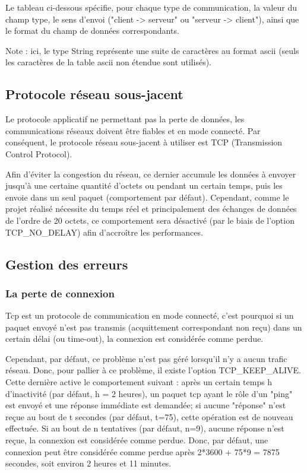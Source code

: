 \documentclass[11pt, a4paper]{report}
\begin{document}
      Le tableau ci-dessous spécifie, pour chaque type de communication, la valeur du champ type, le sens d'envoi ("client -> serveur" ou "serveur -> client"), ainsi 
      que le format du champ de données correspondants.

      
      
      Note : ici, le type String représente une suite de caractères au format ascii (seuls les caractères de la table ascii non étendue sont utilisés). 
    
    \subsection{Protocole réseau sous-jacent}
    
      Le protocole applicatif ne permettant pas la perte de données, les communications réseaux doivent être fiables et en mode connecté.
      Par conséquent, le protocole réseau sous-jacent à utiliser est TCP (Transmission Control Protocol).
      \newline
      
      Afin d'éviter la congestion du réseau, ce dernier accumule les données à envoyer jusqu'à une certaine quantité d'octets ou pendant un certain temps, 
      puis les envoie dans un seul paquet (comportement par défaut). Cependant, comme le projet réalisé nécessite du temps réel et principalement des 
      échanges de données de l'ordre de 20 octets, ce comportement sera désactivé (par le biais de l'option TCP\_NO\_DELAY) afin d’accroître les performances.
	  
    \subsection{Gestion des erreurs}
    
      \subsubsection{La perte de connexion}
    
	Tcp est un protocole de communication en mode connecté, c'est pourquoi si un paquet envoyé n'est pas transmis 
	(acquittement correspondant non reçu) dans un certain délai (ou time-out), la connexion est considérée comme perdue.
	\newline
      
	Cependant, par défaut, ce problème n'est pas géré lorsqu'il n'y a aucun trafic réseau. Donc, pour pallier à ce problème, il existe l'option TCP\_KEEP\_ALIVE. 
	Cette dernière active le comportement suivant : après un certain temps h d'inactivité (par défaut, h = 2 heures), un paquet tcp ayant le rôle d'un "ping" 
	est envoyé et une réponse immédiate est demandée; si aucune "réponse" n'est reçue au bout de t secondes (par défaut, t=75), cette opération est de nouveau 
	effectuée.
Si au bout de n tentatives (par défaut, n=9), aucune réponse n'est reçue, la connexion est considérée comme perdue. Donc, par défaut, 
	une connexion peut être considérée comme perdue après 2*3600 + 75*9 = 7875 secondes, soit environ 2 heures et 11 minutes.
	\newline
	
\end{document}
